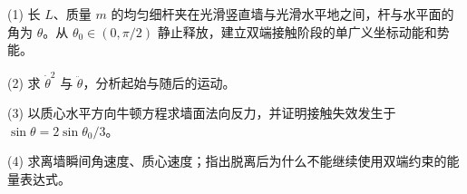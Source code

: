 (1) 长 \(L\)、质量 \(m\) 的均匀细杆夹在光滑竖直墙与光滑水平地之间，杆与水平面的角为 \(\theta\)。从 \(\theta_0\in(0,\pi/2)\) 静止释放，建立双端接触阶段的单广义坐标动能和势能。

(2) 求 \(\dot\theta^2\) 与 \(\ddot\theta\)，分析起始与随后的运动。

(3) 以质心水平方向牛顿方程求墙面法向反力，并证明接触失效发生于 \(\sin\theta=2\sin\theta_0/3\)。

(4) 求离墙瞬间角速度、质心速度；指出脱离后为什么不能继续使用双端约束的能量表达式。

